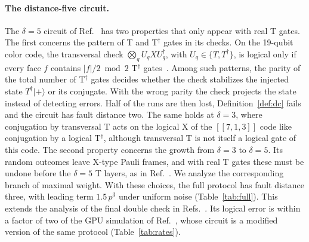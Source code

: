\documentclass[aps,prl,reprint,twocolumn,amsmath,amssymb,floatfix,nofootinbib,superscriptaddress]{revtex4-2}
\theoremstyle{definition}
\theoremstyle{remark}
\begin{document}
\paragraph*{The distance-five circuit.}
The $\delta=5$ circuit of Ref.~\cite{cultivation} has two properties that only appear with real T gates. The first concerns the pattern of T and T$^\dagger$ gates in its checks. On the 19-qubit color code, the transversal check $\bigotimes_q U_qXU_q^\dagger$, with $U_q\in\{T,T^\dagger\}$, is logical only if every face $f$ contains $|f|/2\bmod2$ T$^\dagger$ gates~\cite{chan}. Among such patterns, the parity of the total number of T$^\dagger$ gates decides whether the check stabilizes the injected state $T^\dagger|{+}\rangle$ or its conjugate. With the wrong parity the check projects the state instead of detecting errors. Half of the runs are then lost, Definition~\ref{def:dc} fails and the circuit has fault distance two. The same holds at $\delta=3$, where conjugation by transversal T acts on the logical X of the $[[7,1,3]]$ code like conjugation by a logical T$^\dagger$, although transversal T is not itself a logical gate of this code. The second property concerns the growth from $\delta=3$ to $\delta=5$. Its random outcomes leave X-type Pauli frames, and with real T gates these must be undone before the $\delta=5$ T layers, as in Ref.~\cite{soft}. We analyze the corresponding branch of maximal weight. With these choices, the full protocol has fault distance three, with leading term $1.5\,p^3$ under uniform noise (Table~\ref{tab:full}). This extends the analysis of the final double check in Refs.~\cite{chan,wanzapirain}. Its logical error is within a factor of two of the GPU simulation of Ref.~\cite{soft}, whose circuit is a modified version of the same protocol (Table~\ref{tab:rates}).
\end{document}
